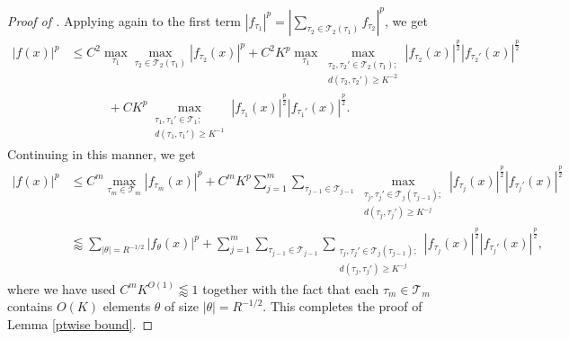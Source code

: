 \documentclass[10pt,a4paper]{amsart}
\newcommand{\less}{\lessapprox}
\begin{document}
\begin{proof}[Proof of ]
Applying  again to the first term $|f_{\tau_1}|^p=|\sum_{\tau_2 \in \mathcal T_2(\tau_1)}f_{\tau_2}|^p$, we get 
\begin{align*}
  |f(x)|^p &\leq C^2 \max_{\tau_1} \max_{\tau_2\in \mathcal T_2(\tau_1)} |f_{\tau_2}(x)|^p + C^2K^p \max_{\tau_1} \max_{\substack{\tau_2,\tau_2' \in \mathcal T_2(\tau_1);\\ d(\tau_2,\tau_2')\ge K^{-2} }} |f_{\tau_2}(x)|^{\frac p2} |f_{\tau_2'}(x)|^{\frac p2} \\ &\qquad \quad+  CK^p \max_{\substack{\tau_1,\tau_1' \in \mathcal T_1;\\ d(\tau_1,\tau_1')\ge K^{-1} }} |f_{\tau_1}(x)|^{\frac p2} |f_{\tau_1'}(x)|^{\frac p2}.
\end{align*}
Continuing in this manner,  we get 
\begin{equation*}
	\begin{split}
  |f(x)|^p &\leq C^m \max_{\tau_m\in \mathcal{T}_m} |f_{\tau_m}(x)|^p + C^mK^p \sum_{j=1}^m \sum_{\tau_{j-1} \in \mathcal T_{j-1}} \max_{\substack{\tau_j,\tau_j' \in \mathcal T_j(\tau_{j-1});\\ d(\tau_j,\tau_j')\ge K^{-j} }} |f_{\tau_j}(x)|^{\frac p2} |f_{\tau_j'}(x)|^{\frac p2} \\
   &\less \sum_{|\theta|=R^{-1/2}} |f_{\theta}(x)|^{p} +  \sum_{j=1}^m \sum_{\tau_{j-1} \in \mathcal T_{j-1}} \sum_{\substack{\tau_j,\tau_j' \in \mathcal T_j(\tau_{j-1});\\ d(\tau_j,\tau_j')\ge K^{-j}  }} |f_{\tau_j}(x)|^{\frac p2} |f_{\tau_j'}(x)|^{\frac p2},
\end{split}
\end{equation*}
where we have used $C^m K^{O(1)} \less 1$ together with the fact that each $\tau_m \in \mathcal{T}_m$ contains $O(K)$ elements $\theta$ of size $|\theta| = R^{-1/2}$.
This completes the proof of Lemma \ref{ptwise bound}.
\end{proof}
\end{document}
